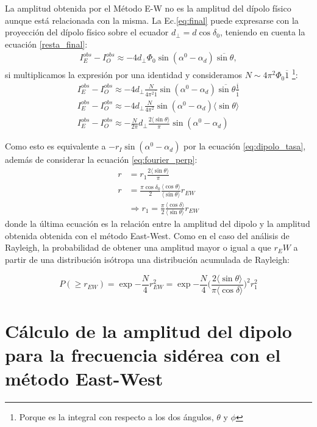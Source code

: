 La amplitud obtenida por el Método E-W no es la amplitud del dípolo físico aunque está relacionada con la misma. La Ec.\ref{eq:final} puede expresarse con la proyección del dípolo físico sobre el ecuador $d_{\perp}= d\cos\delta_0$, teniendo en cuenta la ecuación  \ref{resta_final}:
\begin{align}
    I^{obs}_E -  I^{obs}_O \approx -4 d_\perp \Phi_0 \sin(\alpha^0  - \alpha_d)\overline{\sin\theta},
\end{align}
si multiplicamos la expresión por una identidad y consideramos $N \sim 4\pi^2 \Phi_0 \overline{1} $ \footnote{Porque es la integral con respecto a los dos ángulos, $\theta$ y $\phi$}:
\begin{align}
    I^{obs}_E -  I^{obs}_O \approx -4 d_\perp \frac{N}{ 4\pi^2\overline{1}} \sin(\alpha^0  - \alpha_d)\overline{\sin\theta} \frac{\overline{1}}{\overline{1}}\\
    I^{obs}_E -  I^{obs}_O \approx -4 d_\perp \frac{N}{ 4\pi^2} \sin(\alpha^0  - \alpha_d)\langle\sin\theta \rangle\\
    I^{obs}_E -  I^{obs}_O \approx -\frac{N}{2\pi} d_\perp \frac{2\langle\sin\theta \rangle }{\pi}\sin(\alpha^0  - \alpha_d)
\end{align}

Como esto es equivalente a $-r_I\sin(\alpha^0  - \alpha_d)$ por la ecuación \ref{eq:dipolo_tasa}, además de considerar la ecuación \ref{eq:fourier_perp}:
\begin{align}
    r  &= r_1 \frac{2\langle\sin\theta \rangle }{\pi}\\
    r &= \frac{\pi \cos\delta_0}{2} \frac{\langle\cos\theta \rangle}{\langle\sin\theta \rangle} r_{EW} \\
    &\Rightarrow  r_1 = \frac{\pi}{2} \frac{\langle\cos\delta \rangle}{\langle\sin\theta \rangle} r_{EW}
\end{align}
donde la última ecuación es la relación entre la amplitud del dipolo y la amplitud obtenida obtenida con el método East-West. Como en el caso del análisis de Rayleigh, la probabilidad de obtener una amplitud mayor o igual a que $r_EW$ a partir de una distribución isótropa una distribución acumulada de Rayleigh:

\begin{equation}
    P(\geq r_{EW}) = \exp{-\frac{N}{4}r^2_{EW}} = \exp{-\frac{N}{4} \Big ( \frac{2 \langle\sin\theta \rangle }{\pi \langle\cos\delta \rangle} \Big)^2 r^2_{1} }
\end{equation}


\section{Cálculo de la amplitud del dipolo para la frecuencia sidérea con el método East-West}

